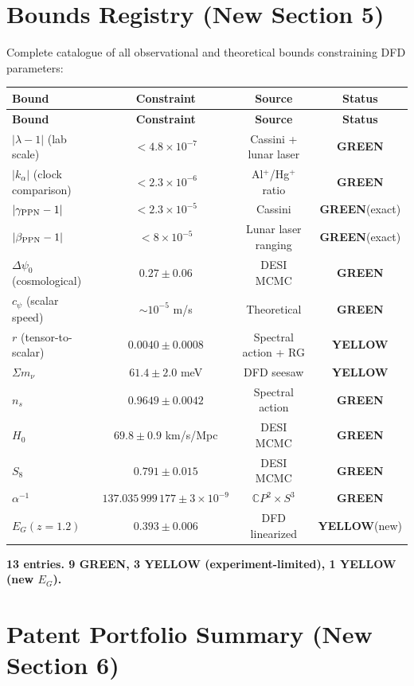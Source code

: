 \documentclass[11pt,a4paper]{article}
\newcommand{\GREEN}{\textcolor{dfdgreen}{\textbf{GREEN}}}
\newcommand{\YELLOW}{\textcolor{dfdyellow}{\textbf{YELLOW}}}
\newcommand{\CP}{\mathbb{C}P}
\begin{document}
\section{Bounds Registry (New Section 5)}

Complete catalogue of all observational and theoretical bounds constraining DFD parameters:

\begin{center}
\begin{longtable}{lccc}
\toprule
\textbf{Bound} & \textbf{Constraint} & \textbf{Source} & \textbf{Status} \\
\midrule
\endfirsthead
\toprule
\textbf{Bound} & \textbf{Constraint} & \textbf{Source} & \textbf{Status} \\
\midrule
\endhead
$|\lambda - 1|$ (lab scale) & $< 4.8 \times 10^{-7}$ & Cassini + lunar laser & \GREEN \\
$|k_\alpha|$ (clock comparison) & $< 2.3 \times 10^{-6}$ & Al$^+$/Hg$^+$ ratio & \GREEN \\
$|\gamma_{\rm PPN} - 1|$ & $< 2.3 \times 10^{-5}$ & Cassini & \GREEN (exact) \\
$|\beta_{\rm PPN} - 1|$ & $< 8 \times 10^{-5}$ & Lunar laser ranging & \GREEN (exact) \\
$\Delta\psi_0$ (cosmological) & $0.27 \pm 0.06$ & DESI MCMC & \GREEN \\
$c_\psi$ (scalar speed) & $\sim 10^{-5}$ m/s & Theoretical & \GREEN \\
$r$ (tensor-to-scalar) & $0.0040 \pm 0.0008$ & Spectral action + RG & \YELLOW \\
$\Sigma m_\nu$ & $61.4 \pm 2.0$ meV & DFD seesaw & \YELLOW \\
$n_s$ & $0.9649 \pm 0.0042$ & Spectral action & \GREEN \\
$H_0$ & $69.8 \pm 0.9$ km/s/Mpc & DESI MCMC & \GREEN \\
$S_8$ & $0.791 \pm 0.015$ & DESI MCMC & \GREEN \\
$\alpha^{-1}$ & $137.035\,999\,177 \pm 3 \times 10^{-9}$ & $\CP^2 \times S^3$ & \GREEN \\
$E_G(z=1.2)$ & $0.393 \pm 0.006$ & DFD linearized & \YELLOW (new) \\
\bottomrule
\end{longtable}
\end{center}

\textbf{13 entries. 9 GREEN, 3 YELLOW (experiment-limited), 1 YELLOW (new $E_G$).}

\section{Patent Portfolio Summary (New Section 6)}
\end{document}
